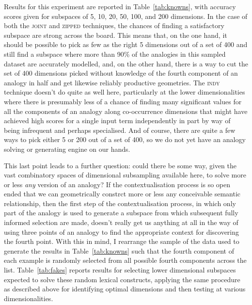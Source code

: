 Results for this experiment are reported in Table~\ref{tab:knowns}, with accuracy scores given for subspaces of 5, 10, 20, 50, 100, and 200 dimensions.  In the case of both the \textsc{joint} and \textsc{zipped} techniques, the chances of finding a satisfactory subspace are strong across the board.  This means that, on the one hand, it should be possible to pick as few as the right 5 dimensions out of a set of 400 and still find a subspace where more than 90\% of the analogies in this sampled dataset are accurately modelled, and, on the other hand, there is a way to cut the set of 400 dimensions picked without knowledge of the fourth component of an analogy in half and get likewise reliably productive geometries.  The \textsc{indy} technique doesn't do quite as well here, particularly at the lower dimensionalities where there is presumably less of a chance of finding many significant values for all the components of an analogy along co-occurrence dimensions that might have achieved high scores for a single input term independently in part by way of being infrequent and perhaps specialised.  And of course, there are quite a few ways to pick either 5 or 200 out of a set of 400, so we do not yet have an analogy solving or generating engine on our hands.

This last point leads to a further question: could there be some way, given the vast combinatory spaces of dimensional subsampling available here, to solve more or less \emph{any} version of an analogy?  If the contextualisation process is so open ended that we can geometrically constrct more or less any conceivable semantic relationship, then the first step of the contextualisation process, in which only part of the analogy is used to generate a subspace from which subsequent fully informed selection are made, doesn't really get us anything at all in the way of using three points of an analogy to find the appropriate context for discovering the fourth point.  With this in mind, I rearrange the sample of the data used to generate the results in Table~\ref{tab:knowns} such that the fourth component of each example is randomly selected from all possible fourth components across the list.  Table~\ref{tab:fakes} reports results for selecting lower dimensional subspaces expected to solve these random lexical constructs, applying the same procedure as described above for identifying optimal dimensions and then testing at various dimensionalities.

